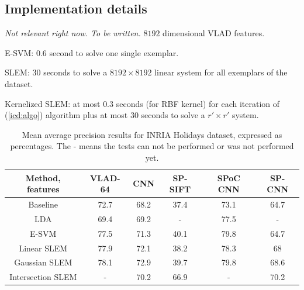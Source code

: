 \subsection{Implementation details}
\emph{\color{red} Not relevant right now.  To be written.}
$8192$ dimensional VLAD features.

E-SVM: $0.6$ second to solve one single exemplar.

SLEM: $30$ seconds to solve a $8192\times 8192$ linear system for all exemplars of the dataset.

Kernelized SLEM: at most $0.3$ seconds (for RBF kernel) for each iteration of (\ref{icd:algo}) algorithm plus at most $30$ seconds to solve a $r'\times r'$ system.

\begin{table}[t]
\begin{center}
\begin{tabular}{|c|c|c|c|c|c|}
\hline
Method, features & VLAD-64 \cite{VLAD}& CNN \cite{jia2014caffe} & SP-SIFT \cite{spk} & SPoC CNN \cite{babenko15} &  SP-CNN \cite{SPPCNN} \\
\hline\hline
Baseline            & 72.7 & 68.2 & 37.4 & 73.1 & 64.7\\
LDA                 & 69.4 & 69.2 & -    & 77.5 & -\\
E-SVM               & 77.5 & 71.3 & 40.1 & 79.8 & 64.7 \\
Linear SLEM         & 77.9 & 72.1 & 38.2 & 78.3 & 68 \\
Gaussian SLEM       & 78.1 & 72.9 & 39.7 & 79.8 & 68.6 \\
Intersection SLEM   & -    & 70.2 & 66.9 & -    & 70.2 \\
\hline
\end{tabular}
\end{center}
\caption{Mean average precision results for INRIA Holidays dataset, expressed as percentages. The - means the tests can not be performed or was not performed yet.}
\end{table}


